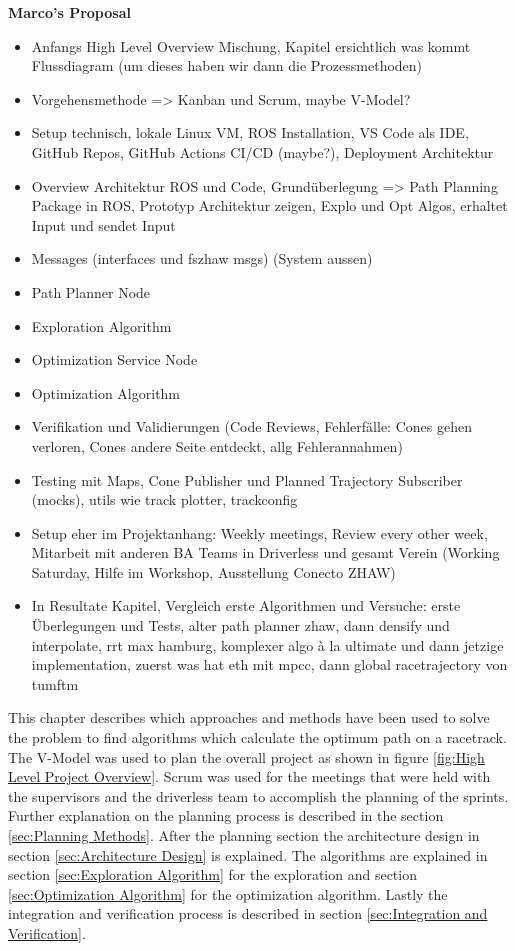 \textbf{Marco's Proposal}
\begin{itemize}
    \item Anfangs High Level Overview Mischung, Kapitel ersichtlich was kommt Flussdiagram (um dieses haben wir dann die Prozessmethoden)
    \item Vorgehensmethode => Kanban und Scrum, maybe V-Model?
    \item Setup technisch, lokale Linux VM, ROS Installation, VS Code als IDE, GitHub Repos, GitHub Actions CI/CD (maybe?), Deployment Architektur
    \item Overview Architektur ROS und Code, Grundüberlegung => Path Planning Package in ROS, Prototyp Architektur zeigen, Explo und Opt Algos, erhaltet Input und sendet Input
    \item Messages (interfaces und fszhaw msgs) (System aussen)
    \item Path Planner Node
    \item Exploration Algorithm
    \item Optimization Service Node
    \item Optimization Algorithm
    \item Verifikation und Validierungen (Code Reviews, Fehlerfälle: Cones gehen verloren, Cones andere Seite entdeckt, allg Fehlerannahmen)
    \item Testing mit Maps, Cone Publisher und Planned Trajectory Subscriber (mocks), utils wie track plotter, trackconfig
    \item Setup eher im Projektanhang: Weekly meetings, Review every other week, Mitarbeit mit anderen BA Teams in Driverless und gesamt Verein (Working Saturday, Hilfe im Workshop, Ausstellung Conecto ZHAW)
    \item In Resultate Kapitel, Vergleich erste Algorithmen und Versuche: erste Überlegungen und Tests, alter path planner zhaw, dann densify und interpolate, rrt max hamburg, komplexer algo à la ultimate und dann jetzige implementation, zuerst was hat eth mit mpcc, dann global racetrajectory von tumftm
\end{itemize}

This chapter describes which approaches and methods have been used to solve the problem to find algorithms which calculate the optimum path on a racetrack. The V-Model was used to plan the overall project as shown in figure \ref{fig:High Level Project Overview}. Scrum was used for the meetings that were held with the supervisors and the driverless team to accomplish the planning of the sprints. Further explanation on the planning process is described in the section \ref{sec:Planning Methods}. After the planning section the architecture design in section \ref{sec:Architecture Design} is explained. The algorithms are explained in section \ref{sec:Exploration Algorithm} for the exploration and section \ref{sec:Optimization Algorithm} for the optimization algorithm. Lastly the integration and verification process is described in section \ref{sec:Integration and Verification}.

